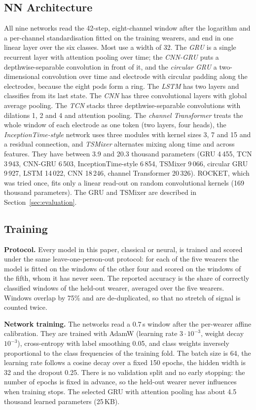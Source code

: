 \documentclass[conference]{IEEEtran}
\begin{document}
\subsection{NN Architecture}
All nine networks read the 42-step, eight-channel window after the logarithm and a
per-channel standardisation fitted on the training wearers, and end in one linear
layer over the six classes. Most use a width of 32. The \emph{GRU} is a single
recurrent layer with attention pooling over time; the \emph{CNN-GRU} puts a
depthwise-separable convolution in front of it, and the \emph{circular GRU} a
two-dimensional convolution over time and electrode with circular padding along
the electrodes, because the eight pods form a ring. The \emph{LSTM} has two layers
and classifies from its last state. The \emph{CNN} has three convolutional layers
with global average pooling. The \emph{TCN} stacks three depthwise-separable
convolutions with dilations 1, 2 and 4 and attention pooling. The \emph{channel
Transformer} treats the whole window of each electrode as one token (two layers,
four heads), the \emph{InceptionTime-style} network uses three modules with kernel
sizes 3, 7 and 15 and a residual connection, and \emph{TSMixer} alternates
mixing along time and across features. They have between 3.9 and 20.3 thousand
parameters (GRU 4\,455, TCN 3\,943, CNN-GRU 6\,503, InceptionTime-style 6\,854,
TSMixer 9\,066, circular GRU 9\,927, LSTM 14\,022, CNN 18\,246, channel Transformer
20\,326). ROCKET, which was tried once, fits only a linear read-out on random
convolutional kernels (169 thousand parameters). The GRU and TSMixer are described
in Section~\ref{sec:evaluation}.
\subsection{Training}
\label{sec:training}

\textbf{Protocol.} Every model in this paper, classical or neural, is trained and
scored under the same leave-one-person-out protocol: for each of the five wearers
the model is fitted on the windows of the other four and scored on the windows of
the fifth, whom it has never seen. The reported accuracy is the share of correctly
classified windows of the held-out wearer, averaged over the five wearers. Windows
overlap by 75\% and are de-duplicated, so that no stretch of signal is counted twice.

\textbf{Network training.} The networks read a 0.7\,s window after the per-wearer
affine calibration. They are trained with AdamW (learning rate $3\cdot10^{-3}$,
weight decay $10^{-3}$), cross-entropy with label smoothing 0.05, and class weights
inversely proportional to the class frequencies of the training fold. The batch size
is 64, the learning rate follows a cosine decay over a fixed 150 epochs, the hidden
width is 32 and the dropout 0.25. There is no validation split and no early
stopping: the number of epochs is fixed in advance, so the held-out wearer never
influences when training stops. The selected GRU with attention pooling has about
4.5 thousand learned parameters (25\,KB).
\end{document}

